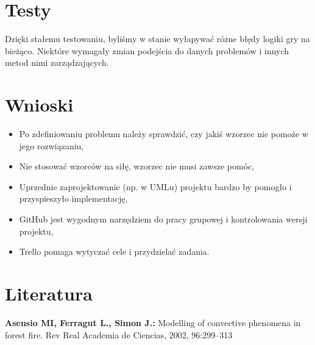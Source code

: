 \documentclass[a4paper, 11pt]{article}
\begin{document}
	\section{Testy}
	Dzięki stałemu testowaniu, byliśmy w stanie wyłapywać różne błędy logiki gry na bieżąco. Niektóre wymagały zmian podejścia do danych problemów i innych metod nimi zarządzających. 

	\section{Wnioski}
	\begin{itemize}
	\item Po zdefiniowaniu problemu należy sprawdzić, czy jakiś wzorzec nie pomoże w jego rozwiązaniu,
	\item Nie stosować wzorców na siłę, wzorzec nie musi zawsze pomóc,
	\item Uprzednie zaprojektowanie (np. w UMLu) projektu bardzo by pomogło i przyspieszyło implementację,
	\item GitHub jest wygodnym narzędziem do pracy grupowej i kontrolowania wersji projektu,
	\item Trello pomaga wytyczać cele i przydzielać zadania.
	\end{itemize}
	

	\section{Literatura}
	
\textbf{Asensio MI, Ferragut L., Simon J.:} Modelling of convective phenomena in forest fire. Rev Real Academia de Ciencias, 2002, 96:299–313\\
\end{document}

